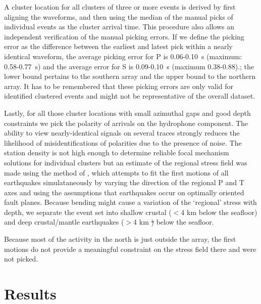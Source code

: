 \documentclass[reviewcopy]{elsart}
\providecommand{\DIFadd}[1]{{\protect\color{blue}\uwave{#1}}} %
\providecommand{\DIFdel}[1]{{\protect\color{red}\sout{#1}}}                      %
\providecommand{\DIFaddbegin}{} %
\providecommand{\DIFaddend}{} %
\providecommand{\DIFdelbegin}{} %
\providecommand{\DIFdelend}{} %
\begin{document}
A cluster location for all clusters of three or more events is derived
by first aligning the waveforms, and then using the median of the
manual picks of individual events as the cluster arrival time.  This
procedure also allows an independent verification of the manual
picking errors.  If we define the picking error as the difference
between the earliest and latest pick within a nearly identical
waveform, the average picking error for P is 0.06-0.10~s (maximum: 0.58-0.77~s)
and the average error for S is 0.09-0.10~s (maximum 0.38-0.88).; the
lower bound pertains to the southern array and the upper bound to the
northern array.  
 It has to be remembered that these picking errors are only valid for
 identified clustered events and might not be representative of the
 overall dataset. 

Lastly, for all those cluster locations 
with small azimuthal
gaps and good depth constraints we pick the polarity of arrivals on the hydrophone
component. The ability to view nearly-identical signals on several
traces strongly reduces the likelihood of misidentifications of
polarities due to the presence of noise. The station density is not
high enough to determine reliable focal mechanism solutions for
individual clusters but an estimate of the regional stress field was
made using the method of \citet{robinson00}, which attempts to fit the
first motions of all earthquakes simulataneously by varying the
direction of the regional P and T axes and using the assumptions that earthquakes
occur on optimally oriented fault planes.  Because bending might cause
a variation of the `regional' stress with depth, we separate the event set
into shallow crustal ($<$4 km below the seafloor) and deep
crustal/mantle earthquakes ($>$4 km \DIFdelbegin \DIFdel{) }\DIFdelend below the seafloor\DIFaddbegin \DIFadd{)}\DIFaddend .

Because most of the activity in the north is just outside the array,
the first motions do not provide a meaningful constraint on the
stress field there and were not picked.
\DIFdelbegin %
\DIFdelend %

\section{Results}
\end{document}
